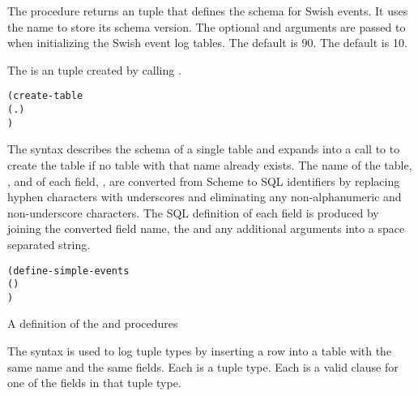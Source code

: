The  procedure returns
an  tuple that defines the schema
for Swish events.
It uses the name  to store its schema version.
The optional  and  arguments are passed to
 when initializing the Swish event log
tables.
The default  is 90.
The default  is 10.

\begin{property}
\end{property}

The  is an  tuple
created by calling .


\begin{syntax}\begin{alltt}
(create-table 
  (  . )
  \etc{})\strut\end{alltt}
\end{syntax}
\expandsto{} 

The  syntax describes the schema of a single
table and expands into a call to  to create the table
if no table with that name already exists. The name of the table,
, and of each field, , are converted from Scheme
to SQL identifiers by replacing hyphen characters with underscores and
eliminating any non-alphanumeric and non-underscore characters. The
SQL definition of each field is produced by joining the converted
field name, the  and any additional  arguments
into a space separated string.

\begin{syntax}\begin{alltt}
(define-simple-events  
  (  \etc{})
  \etc{})\strut\end{alltt}
\end{syntax}
\expandsto{} A definition of the  and 
procedures

The  syntax is used to log tuple types
by inserting a row into a table with the same name and the same
fields. Each  is a tuple type. Each  is a valid
 clause for one of the fields in that tuple
type.

